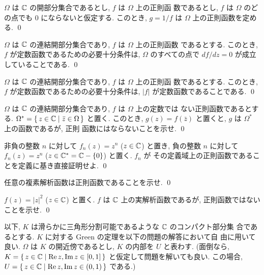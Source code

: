 \documentclass[12pt,twoside]{jarticle}
\begin{document}
\begin{question}
  $\Omega$ は ${\mathbb C}$ の開部分集合であるとし, $f$ は $\Omega$ 上の正則函
  数であるとし, $f$ は $\Omega$ のどの点でも $0$ にならないと仮定する.
  このとき, $g=1/f$ は $\Omega$ 上の正則函数を定める. \qed
\end{question}

\begin{question}
  $\Omega$ は ${\mathbb C}$ の連結開部分集合であり, $f$ は $\Omega$ 上の正則函数
  であるとする. このとき, $f$ が定数函数であるための必要十分条件は,
  $\Omega$ のすべての点で $df/dz=0$ が成立していることである. \qed
\end{question}

\begin{question}
  $\Omega$ は ${\mathbb C}$ の連結開部分集合であり, $f$ は $\Omega$ 上の正則函
  数であるとする. このとき, $f$ が定数函数であるための必要十分条件は,
  $|f|$ が定数函数であることである. \qed
\end{question}

\begin{question}
  $\Omega$ は ${\mathbb C}$ の連結開部分集合であり, $f$ は $\Omega$ 上の定数では
  ない正則函数であるとする. %
  $\Omega^*=\{\,z\in{\mathbb C} \mid \bar z \in \Omega\,\}$ と置く. このとき,
  $g(z)=f(\bar z)$ と置くと, $g$ は $\Omega^*$ 上の函数であるが, 正則
  函数にはならないことを示せ. \qed
\end{question}

\begin{question}
  非負の整数 $n$ に対して $f_n(z)=z^n$ ($z\in{\mathbb C}$) と置き, 負の整数 $n$ 
  に対して $f_n(z)=z^n$ ($z \in {\mathbb C}^* = {\mathbb C} - \{ 0 \}$) と置く. $f_n$ が
  その定義域上の正則函数であることを定義に基き直接証明せよ. \qed
\end{question}

\begin{question}
  任意の複素解析函数は正則函数であることを示せ. \qed
\end{question}

\begin{question}
  $f(z)=|z|^2$ ($z\in{\mathbb C}$) と置く. $f$ は ${\mathbb C}$ 上の実解析函数であるが, 
  正則函数ではないことを示せ. \qed
\end{question}


以下, $K$ は滑らかに三角形分割可能であるような ${\mathbb C}$ のコンパクト部分集
合であるとする. $K$ に対する Green の定理を以下の問題の解答において自
由に用いて良い. %
$\Omega$ は $K$ の開近傍であるとし, $K$ の内部を $U$ と表わす. %
(面倒なら, %
$K=\{\,z\in{\mathbb C}\mid \mathop{\mathrm{Re}}\nolimits z, \mathop{\mathrm{Im}}\nolimits z \in [0,1] \,\}$ %
と仮定して問題を解いても良い. この場合, %
$U=\{\,z\in{\mathbb C}\mid \mathop{\mathrm{Re}}\nolimits z, \mathop{\mathrm{Im}}\nolimits z \in (0,1) \,\}$ %
である.)
\end{document}
